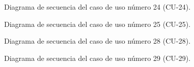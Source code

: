 \begin{figure}[htbp!]
	\begin{center}
		\caption{Diagrama de secuencia del caso de uso número 24 (CU-24).}
		\label{fig:Diagrama de secuencia CU-24}
	\end{center}
\end{figure}

\begin{figure}[htbp!]
	\begin{center}
		\caption{Diagrama de secuencia del caso de uso número 25 (CU-25).}
		\label{fig:Diagrama de secuencia CU-24}
	\end{center}
\end{figure}

\begin{figure}[htbp!]
	\begin{center}
		\caption{Diagrama de secuencia del caso de uso número 28 (CU-28).}
		\label{fig:Diagrama de secuencia CU-28}
	\end{center}
\end{figure}

\begin{figure}[htbp!]
	\begin{center}
		\caption{Diagrama de secuencia del caso de uso número 29 (CU-29).}
		\label{fig:Diagrama de secuencia CU-29}
	\end{center}
\end{figure}

